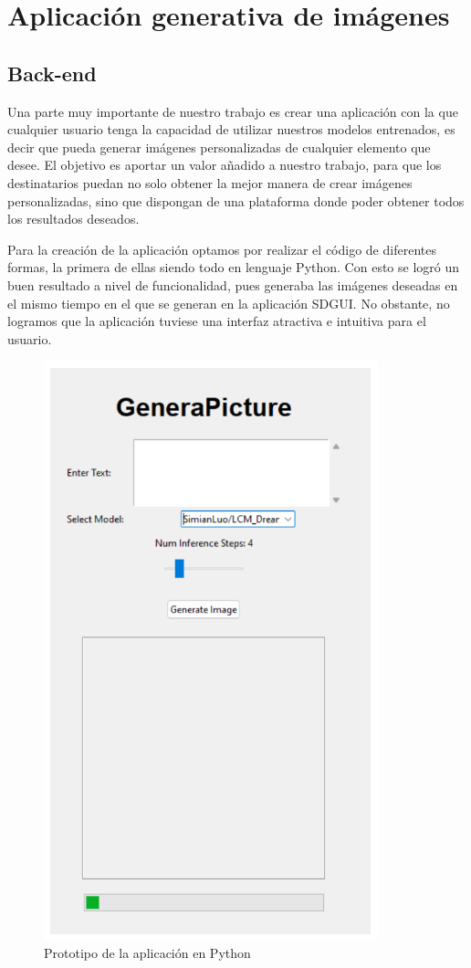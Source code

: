 \chapter{Aplicación generativa de imágenes}
\label{cap:aplicacion}
\section{Back-end}
Una parte muy importante de nuestro trabajo es crear una aplicación con la que cualquier usuario tenga la capacidad de utilizar nuestros modelos entrenados, es decir que pueda generar imágenes personalizadas de cualquier elemento que desee. El objetivo es aportar un valor añadido a nuestro trabajo, para que los destinatarios puedan no solo obtener la mejor manera de crear imágenes personalizadas, sino que dispongan de una plataforma donde poder obtener todos los resultados deseados.

Para la creación de la aplicación optamos por realizar el código de diferentes formas, la primera de ellas siendo todo en lenguaje Python. Con esto se logró un buen resultado a nivel de funcionalidad, pues generaba las imágenes deseadas en el mismo tiempo en el que se generan en la aplicación SDGUI. No obstante, no logramos que la aplicación tuviese una interfaz atractiva e intuitiva para el usuario.\\

\begin{figure}[!htb]
	\centering
	\includegraphics[width = 0.3
	\textwidth]{Imagenes/Vectorial/app1.png}
	\caption{Prototipo de la aplicación en Python}
	\label{fig:app1}
\end{figure}

